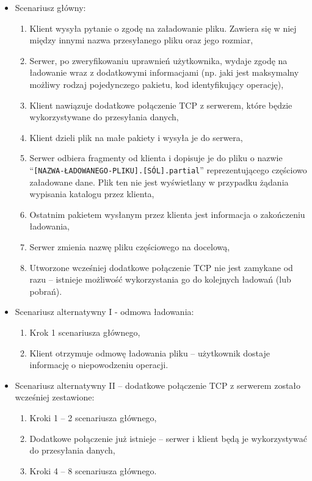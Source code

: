 \documentclass[10pt,a4paper]{article}
\newcommand{\quotes}[1]{``#1''}
\begin{document}
\begin{itemize}
    \item Scenariusz główny:
    \begin{enumerate}
        \item Klient wysyła pytanie o zgodę na załadowanie pliku. Zawiera się w niej między innymi nazwa przesyłanego pliku oraz jego rozmiar,
        \item Serwer, po zweryfikowaniu uprawnień użytkownika, wydaje zgodę na ładowanie wraz z dodatkowymi informacjami (np. jaki jest maksymalny możliwy rodzaj pojedynczego pakietu, kod identyfikujący operację),
        \item Klient nawiązuje dodatkowe połączenie TCP z serwerem, które będzie wykorzystywane do przesyłania danych,
        \item Klient dzieli plik na małe pakiety i wysyła je do serwera,
        \item Serwer odbiera fragmenty od klienta i dopisuje je do pliku o nazwie \quotes{\texttt{[NAZWA-ŁADOWANEGO-PLIKU].[SÓL].partial}} reprezentującego częściowo załadowane dane. Plik ten nie jest wyświetlany w przypadku żądania wypisania katalogu przez klienta,
        \item Ostatnim pakietem wysłanym przez klienta jest informacja o zakończeniu ładowania,
        \item Serwer zmienia nazwę pliku częściowego na docelową,
        \item Utworzone wcześniej dodatkowe połączenie TCP nie jest zamykane od razu -- istnieje możliwość wykorzystania go do kolejnych ładowań (lub pobrań).
    \end{enumerate}

    \item Scenariusz alternatywny I - odmowa ładowania:
    \begin{enumerate}
        \item Krok 1 scenariusza głównego,
        \item Klient otrzymuje odmowę ładowania pliku -- użytkownik dostaje informację o niepowodzeniu operacji.
    \end{enumerate}

    \item Scenariusz alternatywny II -- dodatkowe połączenie TCP z serwerem zostało wcześniej zestawione:
    \begin{enumerate}
        \item Kroki 1 -- 2 scenariusza głównego,
        \item Dodatkowe połączenie już istnieje -- serwer i klient będą je wykorzystywać do przesyłania danych,
        \item Kroki 4 -- 8 scenariusza głównego.
    \end{enumerate}


\end{itemize}
\end{document}
